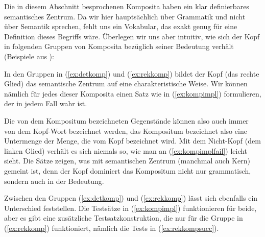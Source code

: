 Die in diesem Abschnitt besprochenen Komposita haben ein klar definierbares semantisches Zentrum.
Da wir hier hauptsächlich über Grammatik und nicht über Semantik sprechen, fehlt uns ein Vokabular, das exakt genug für eine Definition dieses Begriffs wäre.
Überlegen wir uns aber intuitiv, wie sich der Kopf in folgenden Gruppen von Komposita bezüglich seiner Bedeutung verhält (Beispiele aus \citealp[217ff.]{Eisenberg1}):

\begin{exe}
\end{exe}

In den Gruppen in (\ref{ex:detkomp}) und (\ref{ex:rekkomp}) bildet der Kopf (das rechte Glied) das semantische Zentrum auf eine charakteristische Weise.
Wir können nämlich für jedes dieser Komposita einen Satz wie in (\ref{ex:kompimpl}) formulieren, der in jedem Fall wahr ist.

\begin{exe}
  \begin{xlist}
  \end{xlist}
\end{exe}

Die von dem Kompositum bezeichneten Gegenstände können also auch immer von dem Kopf-Wort bezeichnet werden, das Kompositum bezeichnet also eine Untermenge der Menge, die vom Kopf bezeichnet wird.
Mit dem Nicht-Kopf (dem linken Glied) verhält es sich niemals so, wie man an (\ref{ex:kompimplfail}) leicht sieht.
Die Sätze zeigen, was mit semantischen Zentrum (manchmal auch Kern) gemeint ist, denn der Kopf dominiert das Kompositum nicht nur grammatisch, sondern auch in der Bedeutung.

\begin{exe}
  \begin{xlist}
  \end{xlist}
\end{exe}

Zwischen den Gruppen (\ref{ex:detkomp}) und (\ref{ex:rekkomp}) lässt sich ebenfalls ein Unterschied feststellen.
Die Testsätze in (\ref{ex:kompimpl}) funktionieren für beide, aber es gibt eine zusätzliche Testsatzkonstruktion, die nur für die Gruppe in (\ref{ex:rekkomp}) funktioniert, nämlich die Tests in (\ref{ex:rekkompsucc}).

